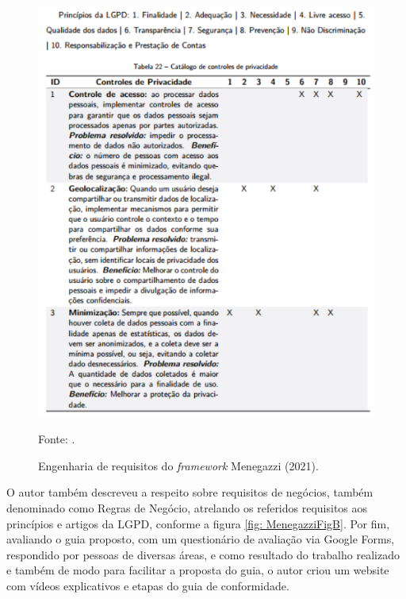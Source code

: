 \documentclass[
	12pt,				%
	openright,			%
	oneside,			%
	a4paper,			%
	english,			%
	french,				%
	spanish,			%
	brazil,				%
	]{abntex2}
\begin{document}
\begin{figure}[ht]
    \centering
    \caption{Engenharia de requisitos do \textit{framework} Menegazzi (2021).}
    \includegraphics[width=6.3in]{Images/09Menegazzi.png}
    \label{fig: Menegazzi }
    
    \centering \small Fonte: \cite{Menegazzi2021}.
\end{figure}


O autor também descreveu a respeito sobre requisitos de negócios, também denominado como Regras de Negócio, atrelando os referidos requisitos aos princípios e artigos da LGPD, conforme a figura \ref{fig: MenegazziFigB}. Por fim, avaliando o guia proposto, com um questionário de avaliação via Google Forms, respondido por pessoas de diversas áreas, e como resultado do trabalho realizado e também de modo para facilitar a proposta do guia, o autor criou um website com vídeos explicativos e etapas do guia de conformidade.
\end{document}
